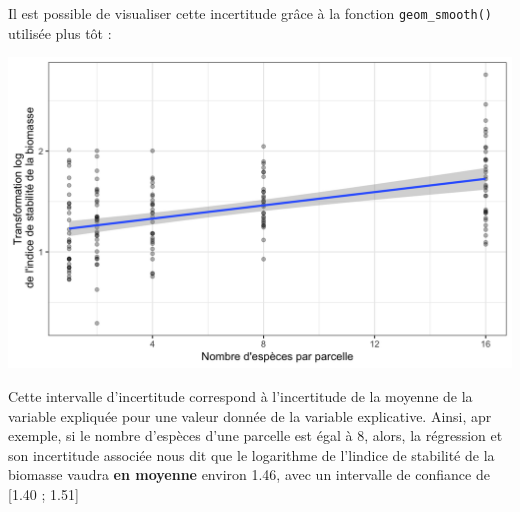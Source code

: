 \documentclass[a4paperpaper,]{article}
\newenvironment{Shaded}{\begin{snugshade}}{\end{snugshade}}
\newcommand{\CharTok}[1]{\textcolor[rgb]{0.57,0.30,0.62}{#1}}
\newcommand{\DataTypeTok}[1]{\textcolor[rgb]{0.00,0.34,0.68}{#1}}
\newcommand{\FloatTok}[1]{\textcolor[rgb]{0.69,0.50,0.00}{#1}}
\newcommand{\KeywordTok}[1]{\textcolor[rgb]{0.12,0.11,0.11}{\textbf{#1}}}
\newcommand{\NormalTok}[1]{\textcolor[rgb]{0.12,0.11,0.11}{#1}}
\newcommand{\OperatorTok}[1]{\textcolor[rgb]{0.12,0.11,0.11}{#1}}
\newcommand{\OtherTok}[1]{\textcolor[rgb]{0.00,0.43,0.16}{#1}}
\newcommand{\StringTok}[1]{\textcolor[rgb]{0.75,0.01,0.01}{#1}}
\begin{document}
Il est possible de visualiser cette incertitude grâce à la fonction \texttt{geom\_smooth()} utilisée plus tôt :

\begin{Shaded}
\end{Shaded}

\begin{center}\includegraphics[width=0.9\linewidth]{figure/unnamed-chunk-121-1} \end{center}

Cette intervalle d'incertitude correspond à l'incertitude de la moyenne de la variable expliquée pour une valeur donnée de la variable explicative. Ainsi, apr exemple, si le nombre d'espèces d'une parcelle est égal à 8, alors, la régression et son incertitude associée nous dit que le logarithme de l'lindice de stabilité de la biomasse vaudra \textbf{en moyenne} environ 1.46, avec un intervalle de confiance de {[}1.40 ; 1.51{]}
\end{document}
